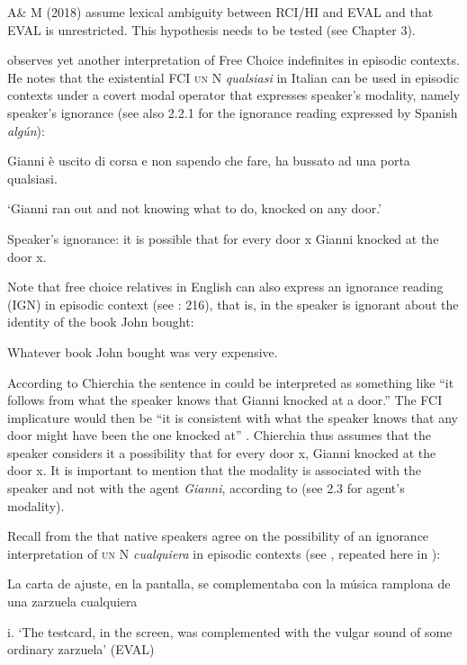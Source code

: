 \documentclass[output=paper]{langscibook}
\begin{document}
  A\& M (2018) assume lexical ambiguity between RCI/HI and EVAL and that EVAL is unrestricted. This hypothesis needs to be tested (see Chapter 3).

  \citet[574]{Chierchia2006} observes yet another interpretation of Free Choice indefinites in episodic contexts. He notes that the existential FCI \textsc{un} N \textit{qualsiasi} in Italian can be used in episodic contexts under a covert modal operator that expresses speaker’s modality, namely speaker’s ignorance (see also 2.2.1 for the ignorance reading expressed by Spanish \textit{algún}):

\label{bkm:Ref533762757}  Gianni è uscito di corsa e non sapendo che fare, ha bussato ad una porta qualsiasi.

  ‘Gianni ran out and not knowing what to do, knocked on any door.’

Speaker’s ignorance: it is possible that for every door x Gianni knocked at the door x.

  \citep[574]{Chierchia2006}

Note that free choice relatives in English can also express an ignorance reading (IGN) in episodic context (see \citealt{Condoravdi2015}: 216), that is, in  the speaker is ignorant about the identity of the book John bought:

  Whatever book John bought was very expensive.

According to Chierchia the sentence in  could be interpreted as something like “it follows from what the speaker knows that Gianni knocked at a door.” The FCI implicature would then be “it is consistent with what the speaker knows that any door might have been the one knocked at” \citep[574]{Chierchia2006}. Chierchia thus assumes that the speaker considers it a possibility that for every door x, Gianni knocked at the door x. It is important to mention that the modality is associated with the speaker and not with the agent \textit{Gianni}, according to \citet{Chierchia2006} (see 2.3 for agent’s modality). 

  Recall from the  that native speakers agree on the possibility of an ignorance interpretation of \textsc{un} N \textit{cualquiera} in episodic contexts (see , repeated here in ):

\label{bkm:Ref72400981}  La carta de ajuste, en la pantalla, se complementaba con la música ramplona de una zarzuela cualquiera 

  i.   ‘The testcard, in the screen, was complemented with the vulgar sound of some ordinary zarzuela’   (EVAL)
\end{document}

